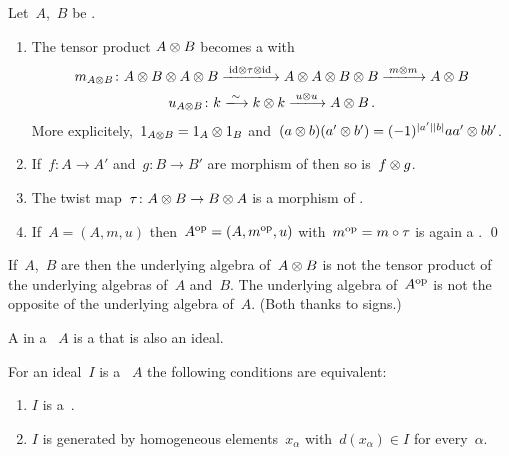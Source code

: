 \documentclass[a4paper,10pt,headings=standardclasses]{scrartcl}
\begin{document}
\begin{lemma}
  Let~$A$,~$B$ be {\dgas}.
  \begin{enumerate}
    \item
      The tensor product $A \otimes B$ becomes a {\dga} with
      \begin{gather*}
        m_{A \tensor B}
        \colon
        A \tensor B \tensor A \tensor B
        \xlongto{{\id} \tensor \tau \tensor {\id}}
        A \tensor A \tensor B \tensor B
        \xlongto{m \tensor m}
        A \tensor B
      \\
        u_{A \tensor B}
        \colon
        k
        \xlongto{\sim}
        k \tensor k
        \xlongto{u \tensor u}
        A \tensor B \,.
      \end{gather*}
      More explicitely,~$1_{A \otimes B} = 1_A \otimes 1_B$ and~$(a \otimes b) (a' \otimes b') = (-1)^{\lvert a'\rvert \lvert b\rvert} a a' \otimes b b'$.
    \item
      If~$f \colon A \to A'$ and~$g \colon B \to B'$ are morphism of {\dgas} then so is~$f \otimes g$.
    \item
      The twist map~$\tau \colon A \otimes B \to B \otimes A$ is a morphism of {\dgas}.
    \item
      If~$A = (A, m, u)$ then~$A^{\mathrm{op}} = (A, m^{\mathrm{op}}, u)$ with~$m^{\mathrm{op}} = m \circ \tau$ is again a {\dga}.
    \qed
  \end{enumerate}
\end{lemma}

\begin{warning}
  If~$A$,~$B$ are {\dgas} then the underlying algebra of~$A \otimes B$ is not the tensor product of the underlying algebras of~$A$ and~$B$.
  The underlying algebra of~$A^{\mathrm{op}}$ is not the opposite of the underlying algebra of~$A$.
  (Both thanks to signs.)
\end{warning}

\begin{definition}
  A  in a {\dga}~$A$ is a {\dgsub} that is also an ideal.
\end{definition}

\begin{lemma}
  For an ideal~$I$ is a {\dga}~$A$ the following conditions are equivalent:
  \begin{enumerate}
    \item
      $I$ is a~{\dgi}.
    \item
      $I$ is generated by homogeneous elements~$x_\alpha$ with~$d(x_\alpha) \in I$ for every~$\alpha$.
  \end{enumerate}
\end{lemma}
\end{document}
